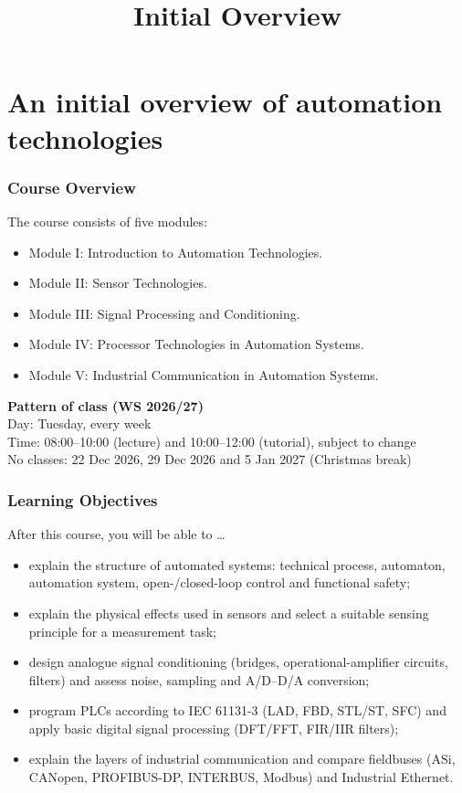 \title[Initial overview]{Initial Overview}
\section{An initial overview of automation technologies}
\begin{frame}
	\frametitle{Course Overview}
	The course consists of five modules:
	\begin{itemize}
		\item Module I: Introduction to Automation Technologies.
		\item Module II: Sensor Technologies.
		\item Module III: Signal Processing and Conditioning.
		\item Module IV: Processor Technologies in Automation Systems.
		\item Module V: Industrial Communication in Automation Systems.
	\end{itemize}
	\vspace{2mm}
	\textbf{Pattern of class (WS 2026/27)}\\
	Day: Tuesday, every week\\
	Time: 08:00--10:00 (lecture) and 10:00--12:00 (tutorial), subject to change\\
	No classes: 22 Dec 2026, 29 Dec 2026 and 5 Jan 2027 (Christmas break)
\end{frame}

\begin{frame}
	\frametitle{Learning Objectives}
	After this course, you will be able to \ldots
	\begin{itemize}
		\item explain the structure of automated systems: technical process, automaton, automation system, open-/closed-loop control and functional safety;
		\item explain the physical effects used in sensors and select a suitable sensing principle for a measurement task;
		\item design analogue signal conditioning (bridges, operational-amplifier circuits, filters) and assess noise, sampling and A/D--D/A conversion;
		\item program PLCs according to IEC 61131-3 (LAD, FBD, STL/ST, SFC) and apply basic digital signal processing (DFT/FFT, FIR/IIR filters);
		\item explain the layers of industrial communication and compare fieldbuses (ASi, CANopen, PROFIBUS-DP, INTERBUS, Modbus) and Industrial Ethernet.
	\end{itemize}
\end{frame}

